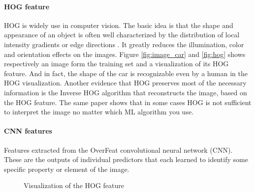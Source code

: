 \documentclass{article} %
\begin{document}
\paragraph{HOG feature} HOG is widely use in computer vision. 
The basic idea is that the shape and appearance of an object is often well characterized by the distribution of local intensity gradients or edge directions \cite{hog}. It greatly reduces the illumination, color and orientation effects on the images.
Figure \ref{fig:image_car} and \ref{fig:hog} shows respectively an image form the training set and a visualization of its HOG feature.
And in fact, the shape of the car is recognizable even by a human in the HOG visualization. Another evidence that HOG preserves most of the necessary information is the Inverse HOG algorithm\cite{vondrick2015visualizing} that reconstructs the image, based on the HOG feature. The same paper shows that in some cases HOG is not sufficient to interpret the image no matter which ML algorithm you use.

\paragraph{CNN features} Features extracted from the OverFeat convolutional neural network (CNN). These are the outputs of individual predictors that each learned to identify some specific property or element of the image.

\begin{figure}[!t]
	\centering
	\hspace{10pt}
	\caption{Visualization of the HOG feature}
\end{figure}
\end{document}
